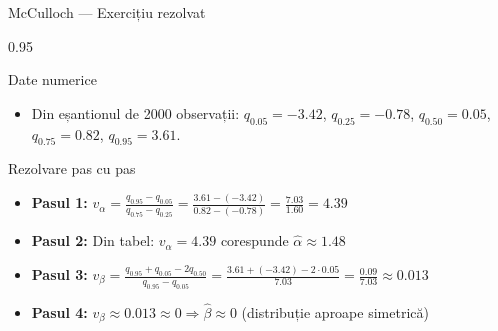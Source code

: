 \documentclass[9pt, aspectratio=169, t]{beamer}
\begin{document}
\begin{frame}{McCulloch --- Exercițiu rezolvat}
    \begin{cminipage}{0.95\textwidth}
\begin{block}{Date numerice}
\begin{itemize}\setlength{\itemsep}{0pt}
    \item Din eșantionul de 2000 observații: $q_{0.05} = -3.42$, $q_{0.25} = -0.78$, $q_{0.50} = 0.05$, $q_{0.75} = 0.82$, $q_{0.95} = 3.61$.
\end{itemize}
\end{block}

\begin{exampleblock}{Rezolvare pas cu pas}
\small
\begin{itemize}\setlength{\itemsep}{0pt}
    \item \textbf{Pasul 1:} $v_\alpha = \frac{q_{0.95} - q_{0.05}}{q_{0.75} - q_{0.25}} = \frac{3.61 - (-3.42)}{0.82 - (-0.78)} = \frac{7.03}{1.60} = 4.39$
    \item \textbf{Pasul 2:} Din tabel: $v_\alpha = 4.39$ corespunde $\hat{\alpha} \approx 1.48$
    \item \textbf{Pasul 3:} $v_\beta = \frac{q_{0.95} + q_{0.05} - 2q_{0.50}}{q_{0.95} - q_{0.05}} = \frac{3.61 + (-3.42) - 2 \cdot 0.05}{7.03} = \frac{0.09}{7.03} \approx 0.013$
    \item \textbf{Pasul 4:} $v_\beta \approx 0.013 \approx 0 \Rightarrow \hat{\beta} \approx 0$ (distribuție aproape simetrică)
\end{itemize}
\end{exampleblock}
    \end{cminipage}
\end{frame}
\end{document}
